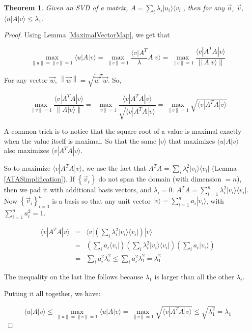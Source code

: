 \documentclass{amsbook}
\newtheorem{theorem}{Theorem}
\begin{document}
 \begin{theorem}
\label{upperbound}
Given an SVD of a matrix, $A=\sum_i\lambda_i|u_i\rangle\langle v_i|$, then for any $\vec u$, $\vec v$, $\langle u|A|v\rangle\leq\lambda_1$.
 \end{theorem}

\begin{proof}
Using Lemma \ref{MaximalVectorMap}, we get that

$$
\max_{\|u\|=\|v\|=1}\langle u|A|v\rangle = \max_{\|v\|=1}\frac{\langle v|A^T}{\lambda}A|v\rangle = \max_{\|v\|=1} \frac{\langle v|A^TA|v\rangle}{\left\|A|v\rangle\right\|}
$$

For any vector $\vec w$, $\left\|\vec w\right\|=\sqrt{\vec w^T\vec w}$.  So,

$$
\max_{\|v\|=1} \frac{\langle v|A^TA|v\rangle}{\left\|A|v\rangle\right\|}
= \max_{\|v\|=1} \frac{\langle v|A^TA|v\rangle}{\sqrt{\langle v|A^TA|v\rangle}}
= \max_{\|v\|=1} \sqrt{\langle v|A^TA|v\rangle}
$$

A common trick is to notice that the square root of a value is maximal exactly when the value itself is maximal.  So that the same $|v\rangle$ that maximizes $\langle u|A|v\rangle$ also maximizes $\langle v|A^TA|v\rangle$.

So to maximize $\langle v|A^TA|v\rangle$, we use the fact that $A^TA=\sum_i\lambda_i^2|v_i\rangle\langle v_i|$ (Lemma \ref{ATASimplification}).  If $\left\{\vec v_i\right\}$ do not span the domain (with dimension $=n$), then we pad it with additional basis vectors, and $\lambda_i=0$.  $A^TA=\sum_{i=1}^n\lambda_i^2|v_i\rangle\langle v_i|$.  Now $\left\{\vec v_i\right\}_{i=1}^n$ is a basis so that any unit vector $|v\rangle = \sum_{i=1}^na_i|v_i\rangle$, with $\sum_{i=1}^na_i^2 =1$.

\begin{equation}
\label{UpperboundEquation}
\begin{array}{rcl}
\langle v|A^TA|v\rangle &=& \langle v|\left(\sum_i\lambda_i^2|v_i\rangle\langle v_i|\right)|v\rangle \\
 &=& \left(\sum_i a_i\langle v_i|\right)\left(\sum_i\lambda_i^2|v_i\rangle\langle v_i|\right)\left(\sum_i a_i|v_i\rangle\right) \\
 &=& \sum_ia_i^2\lambda_i^2 
 \leq \sum_ia_i^2\lambda_1^2 
 = \lambda_1^2
\end{array}
\end{equation}

The inequality on the last line follows because $\lambda_1$ is larger than all the other $\lambda_i$.

Putting it all together, we have:

$$
\langle u|A|v\rangle\leq\max_{\|u\|=\|v\|=1}\langle u|A|v\rangle=\max_{\|v\|=1}\sqrt{\langle v|A^TA|v\rangle}\leq\sqrt{\lambda_1^2}=\lambda_1
$$
\end{proof}
\end{document}
